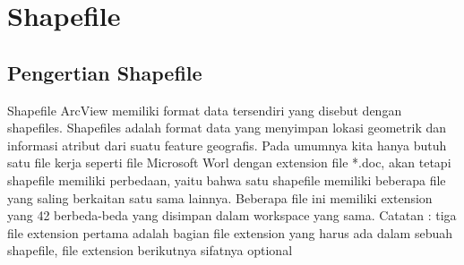\section{Shapefile}
\subsection{Pengertian Shapefile}
Shapefile ArcView memiliki format data tersendiri yang disebut dengan shapefiles. 
Shapefiles adalah format data yang menyimpan lokasi geometrik dan informasi atribut dari suatu feature geografis. 
Pada umumnya kita hanya butuh satu file kerja seperti file Microsoft Worl dengan extension file *.doc, 
akan tetapi shapefile memiliki perbedaan, yaitu bahwa satu shapefile memiliki beberapa file yang saling berkaitan satu sama lainnya. 
Beberapa file ini memiliki extension yang 42 berbeda-beda yang disimpan dalam workspace yang sama.
Catatan : tiga file extension pertama adalah bagian file extension yang harus ada dalam sebuah shapefile, file extension berikutnya sifatnya optional
